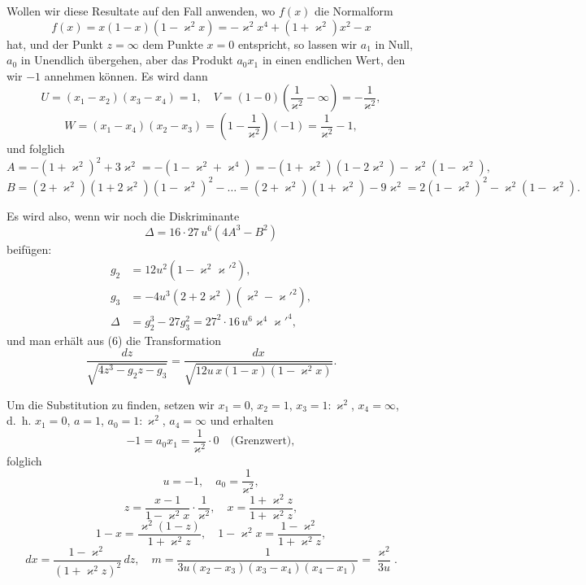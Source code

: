 \documentclass[12pt,a4paper]{book}
\theoremstyle{definition}
\begin{document}
Wollen wir diese Resultate auf den Fall anwenden, wo $f(x)$
die Normalform
\[
f(x) = x(1 - x)(1 - \varkappa^2 x) = -\varkappa^2 x^4 + (1 + \varkappa^2)x^2 - x
\]
hat, und der Punkt $z = \infty$ dem Punkte $x = 0$ entspricht,
so lassen wir $a_1$ in Null, $a_0$ in Unendlich \"ubergehen, aber das
Produkt $a_0 x_1$ in einen endlichen Wert, den wir $-1$ annehmen
k\"onnen. Es wird dann
\[
U = (x_1 - x_2)(x_3 - x_4) = 1, \quad V = (1 - 0)\left(\frac{1}{\varkappa^2} - \infty\right) = -\frac{1}{\varkappa^2},
\]
\[
W = (x_1 - x_4)(x_2 - x_3) = \left(1 - \frac{1}{\varkappa^2}\right)(-1) = \frac{1}{\varkappa^2} - 1,
\]
und folglich
\[
A = -(1 + \varkappa^2)^2 + 3\varkappa^2 = -(1 - \varkappa^2 + \varkappa^4) = -(1 + \varkappa^2)(1 - 2\varkappa^2) - \varkappa^2(1 - \varkappa^2),
\]
\[
B = (2 + \varkappa^2)(1 + 2\varkappa^2)(1 - \varkappa^2)^2 - \dots = (2 + \varkappa^2)(1 + \varkappa^2) - 9\varkappa^2 = 2(1 - \varkappa^2)^2 - \varkappa^2(1 - \varkappa^2).
\]

Es wird also, wenn wir noch die Diskriminante
\[
\Delta = 16 \cdot 27\,u^6(4A^3 - B^2)
\]
beif\"ugen:
\begin{equation}
\begin{aligned}
g_2 &= 12u^2(1 - \varkappa^2\varkappa'^2),\\
g_3 &= -4u^3(2 + 2\varkappa^2)(\varkappa^2 - \varkappa'^2),\\
\Delta &= g_2^3 - 27g_3^2 = 27^2 \cdot 16\,u^6 \varkappa^4 \varkappa'^4,
\end{aligned}
\tag{9}
\end{equation}
und man erh\"alt aus (6) die Transformation
\begin{equation}
\frac{dz}{\sqrt{4z^3 - g_2 z - g_3}} = \frac{dx}{\sqrt{12u\,x(1 - x)(1 - \varkappa^2 x)}}. \tag{10}
\end{equation}

Um die Substitution zu finden, setzen wir $x_1 = 0$, $x_2 = 1$,
$x_3 = 1:\varkappa^2$, $x_4 = \infty$, d.~h. $x_1 = 0$, $a = 1$, $a_0 = 1:\varkappa^2$, $a_4 = \infty$
und erhalten
\[
-1 = a_0 x_1 = \frac{1}{\varkappa^2} \cdot 0 \quad \text{(Grenzwert)},
\]
folglich
\[
u = -1, \quad a_0 = \frac{1}{\varkappa^2},
\]
\[
z = \frac{x - 1}{1 - \varkappa^2 x} \cdot \frac{1}{\varkappa^2}, \quad x = \frac{1 + \varkappa^2 z}{1 + \varkappa^2 z},
\]
\[
1 - x = \frac{\varkappa^2(1 - z)}{1 + \varkappa^2 z}, \quad 1 - \varkappa^2 x = \frac{1 - \varkappa^2}{1 + \varkappa^2 z},
\]
\[
dx = \frac{1 - \varkappa^2}{(1 + \varkappa^2 z)^2}\,dz, \quad m = \frac{1}{3u(x_2 - x_3)(x_3 - x_4)(x_4 - x_1)} = \frac{\varkappa^2}{3u}.
\]
\end{document}
